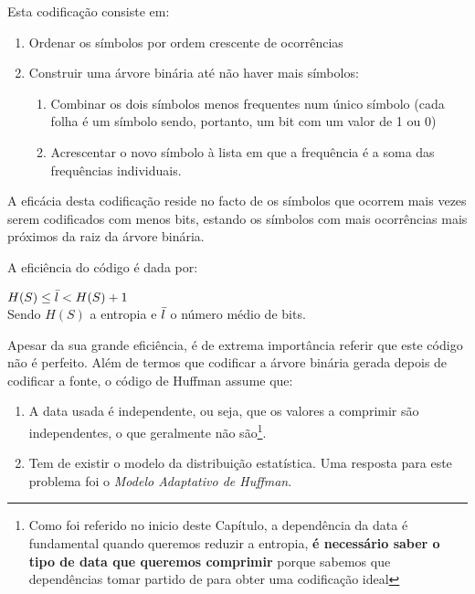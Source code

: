 \documentclass[10pt,journal,compsoc]{IEEEtran}
\begin{document}
    Esta codificação consiste em:
    \begin{enumerate}
        \item Ordenar os símbolos por ordem crescente de ocorrências
        \item Construir uma árvore binária até não haver mais símbolos:
        \begin{enumerate}
            \item Combinar os dois símbolos menos frequentes num único símbolo (cada folha é um símbolo sendo, portanto, um bit com um valor de 1 ou 0)
            \item Acrescentar o novo símbolo à lista em que a frequência é a soma das frequências individuais.
        \end{enumerate}
    \end{enumerate}
    A eficácia desta codificação reside no facto de os símbolos que ocorrem mais vezes serem codificados com menos bits, estando os símbolos com mais ocorrências mais próximos da raiz da árvore binária.
    
    A eficiência do código é dada por:
    \begin{center}
    \begin{math}H(S)\leq\Bar{l}<H(S)+1\end{math}\\
    \small Sendo \begin{math}H(S)\end{math} a entropia e \begin{math}\Bar{l}\end{math} o número médio de bits.  
    \end{center}
    
    Apesar da sua grande eficiência, é de extrema importância referir que este código não é perfeito. Além de termos que codificar a árvore binária gerada depois de codificar a fonte, o código de Huffman assume que:
    \begin{enumerate}
        \item A data usada é independente, ou seja, que os valores a comprimir são independentes, o que geralmente não são\footnote{Como foi referido no inicio deste Capítulo, a dependência da data é fundamental quando queremos reduzir a entropia, \textbf{é necessário saber o tipo de data que queremos comprimir} porque sabemos que dependências tomar partido de para obter uma codificação ideal}.
        \item Tem de existir o modelo da distribuição estatística. Uma resposta para este problema foi o \textit{Modelo Adaptativo de Huffman}.
    \end{enumerate}
    
\end{document}
